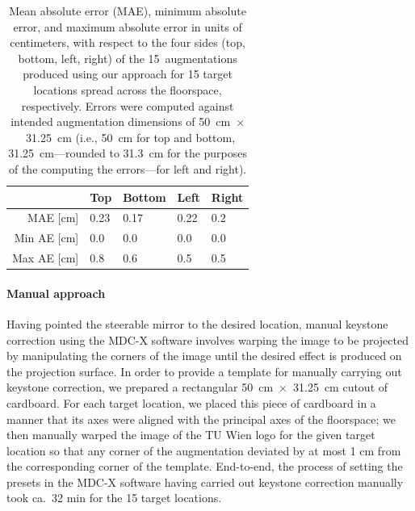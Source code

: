 \documentclass[review]{elsarticle}
\begin{document}
\begin{table}[ht!]
\caption{Mean absolute error (MAE), minimum absolute error, and maximum absolute error in units of centimeters, with respect to the four sides (top, bottom, left, right) of the 15~augmentations produced using our approach for 15 target locations spread across the floorspace, respectively. Errors were computed against intended augmentation dimensions of 50~cm~$\times$~31.25~cm (i.e., 50~cm for top and bottom, 31.25~cm---rounded to 31.3~cm for the purposes of the computing the errors---for left and right).} %
\label{table:length}
\centering
{\small
\begin{tabularx}{7.4cm}{r p{1cm} p{1cm} p{1cm} p{1cm}}
\toprule
  & Top & Bottom & Left & Right \\
\midrule
MAE {\tiny[cm]} & 0.23 & 0.17 & 0.22 & 0.2 \\
Min AE {\tiny[cm]} & 0.0 & 0.0 & 0.0 & 0.0 \\
Max AE {\tiny[cm]} & 0.8 & 0.6 & 0.5 & 0.5 \\
\bottomrule
\end{tabularx}}
\end{table}

\paragraph{Manual approach} Having pointed the steerable mirror to the desired location, manual keystone correction using the MDC-X software involves warping the image to be projected by manipulating the corners of the image until the desired effect is produced on the projection surface. In order to provide a template for manually carrying out keystone correction, we prepared a rectangular 50~cm~$\times$~31.25~cm cutout of cardboard. For each target location, we placed this piece of cardboard in a manner that its axes were aligned with the principal axes of the floorspace; we then manually warped the image of the TU Wien logo for the given target location so that any corner of the augmentation deviated by at most 1 cm from the corresponding corner of the template. End-to-end, the process of setting the presets in the MDC-X software having carried out keystone correction manually took ca.\ 32 min for the 15 target locations.
\end{document}
